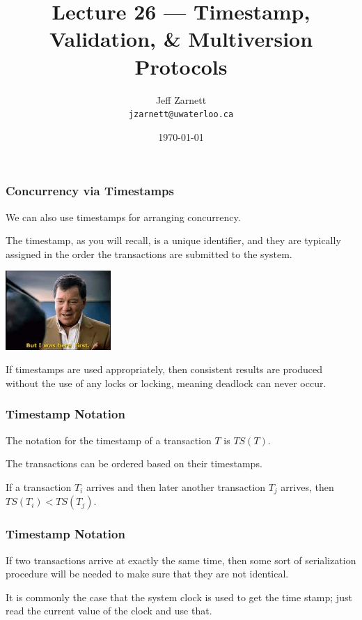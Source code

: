 

\title{Lecture  26 --- Timestamp, Validation, \& Multiversion Protocols }

\author{Jeff Zarnett \\ \small \texttt{jzarnett@uwaterloo.ca}}
\date{\today}




\begin{frame}
  \titlepage

 \end{frame}


\begin{frame}
\frametitle{Concurrency via Timestamps}

We can also use timestamps for arranging concurrency. 

The timestamp, as you will recall, is a unique identifier, and they are typically assigned in the order the transactions are submitted to the system. 

\begin{center}
	\includegraphics[width=0.3\textwidth]{images/herefirst.jpg}
\end{center}

If timestamps are used appropriately, then consistent results are produced without the use of any locks or locking, meaning deadlock can never occur.

\end{frame}

\begin{frame}
\frametitle{Timestamp Notation}
The notation for the timestamp of a transaction $T$ is $T\!S(T)$. 

The transactions can be ordered based on their timestamps. 

If a transaction $T_{i}$ arrives and then later another transaction $T_{j}$ arrives, then $T\!S(T_{i}) < T\!S(T_{j})$. 

\end{frame}

\begin{frame}
\frametitle{Timestamp Notation}

If two transactions arrive at exactly the same time, then some sort of serialization procedure will be needed to make sure that they are not identical. 

It is commonly the case that the system clock is used to get the time stamp; just read the current value of the clock and use that.


\end{frame}

